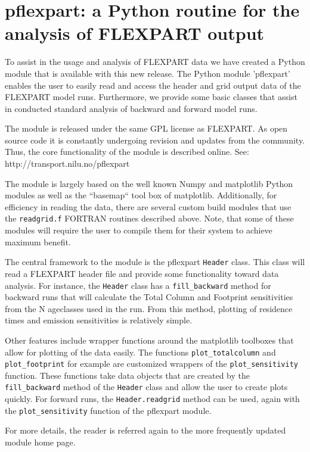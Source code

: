 \documentclass{egu}            %
\begin{document}
\section{pflexpart: a Python routine for the analysis of FLEXPART output}

To assist in the usage and analysis of FLEXPART data we have created a Python
module that is available with this new release.  The Python module 'pflexpart'
enables the user to easily read and access the header and grid output data of
the FLEXPART model runs.  Furthermore, we provide some basic classes that
assist in conducted standard analysis of backward and forward model runs.

The module is released under the same GPL license as FLEXPART.  As open source
code it is constantly undergoing revision and updates from the community.
Thus, the core functionality of the module is described online.  See:
http://transport.nilu.no/pflexpart

The module is largely based on the well known Numpy and matplotlib Python
modules as well as the {``basemap``} tool box of matplotlib.  Additionally, for
efficiency in reading the data, there are several custom build modules that use
the \verb|readgrid.f| FORTRAN routines described above.  Note, that some of
these modules will require the user to compile them for their system to achieve
maximum benefit.

The central framework to the module is the pflexpart \verb|Header| class.  This
class will read a FLEXPART header file and provide some functionality toward
data analysis.  For instance, the \verb|Header| class has a
\verb|fill_backward| method for backward runs that will calculate the Total
Column and Footprint sensitivities from the N ageclasses used in the run.  From
this method, plotting of residence times and emission sensitivities is
relatively simple.

Other features include wrapper functions around the matplotlib toolboxes that
allow for plotting of the data easily.  The functions \verb|plot_totalcolumn|
and \verb|plot_footprint| for example are customized wrappers of the
\verb|plot_sensitivity| function.  These functions take data objects that are
created by the \verb|fill_backward| method of the \verb|Header| class and allow
the user to create plots quickly.  For forward runs, the \verb|Header.readgrid|
method can be used, again with the \verb|plot_sensitivity| function of the
pflexpart module.

For more details, the reader is referred again to the more frequently updated
module home page.
\end{document}
